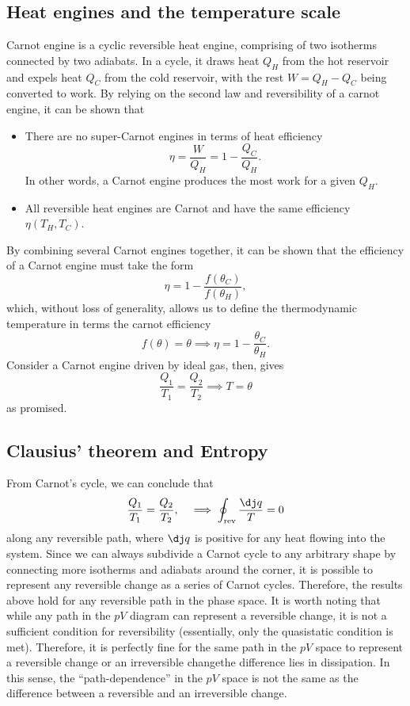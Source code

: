 \documentclass{article}
\theoremstyle{nonumberplain}
\begin{document}
\subsection{Heat engines and the temperature scale}
Carnot engine is a cyclic reversible heat engine, comprising of two isotherms connected by two adiabats. In a cycle, it draws heat $Q_H$ from the hot reservoir and expels heat $Q_C$ from the cold reservoir, with the rest $W = Q_H - Q_C$ being converted to work. By relying on the second law and reversibility of a carnot engine, it can be shown that
\begin{itemize}
    \item There are no super-Carnot engines in terms of heat efficiency 
    \[
        \eta  = \frac{W}{Q_H} = 1 - \frac{Q_C}{Q_H}.
    \]
    In other words, a Carnot engine produces the most work for a given $Q_H.$
    \item All reversible heat engines are Carnot and have the same efficiency $\eta(T_H, T_C).$
\end{itemize}

By combining several Carnot engines together, it can be shown that the efficiency of a Carnot engine must take the form
\[
    \eta = 1- \frac{f(\theta_C)}{f(\theta_H)},
\]
which, without loss of generality, allows us to define the thermodynamic temperature in terms the carnot efficiency 
\[
    f(\theta ) = \theta \implies \eta  = 1 - \frac{\theta_C}{\theta_H}.
\]
Consider a Carnot engine driven by ideal gas, then, gives
\[
    \boxed{\frac{Q_1}{T_1} = \frac{Q_2}{T_2}} \implies  
    T = \theta
\]
as promised. 

\subsection{Clausius' theorem and Entropy}
From Carnot's cycle, we can conclude that 
\[
    \frac{Q_1}{T_1} = \frac{Q_2}{T_2},
    \quad \implies 
    \oint_{\mathrm{rev} } \frac{\dj q}{T}= 0
\]
along any reversible path, where $\dj q$ is positive for any heat flowing into the system. Since we can always subdivide a Carnot cycle to any arbitrary shape by connecting more isotherms and adiabats around the corner, it is possible to represent any reversible change as a series of Carnot cycles. Therefore, the results above hold for any reversible path in the phase space. It is worth noting that while any path in the $pV$ diagram can represent a reversible change, it is not a sufficient condition for reversibility (essentially, only the quasistatic condition is met). Therefore, it is perfectly fine for the same path in the $pV$ space to represent a reversible change or an irreversible change\textemdash the difference lies in dissipation. In this sense, the ``path-dependence'' in the $pV$ space is not the same as the difference between a reversible and an irreversible change.
\end{document}
